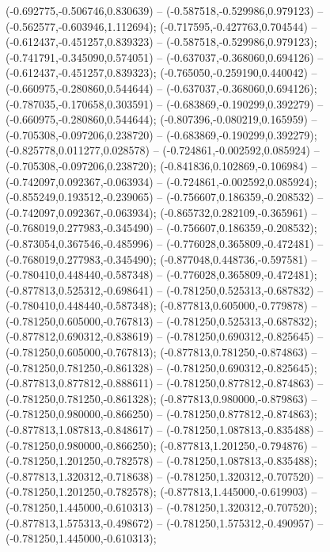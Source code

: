  (-0.692775,-0.506746,0.830639) -- (-0.587518,-0.529986,0.979123) -- (-0.562577,-0.603946,1.112694);
 (-0.717595,-0.427763,0.704544) -- (-0.612437,-0.451257,0.839323) -- (-0.587518,-0.529986,0.979123);
 (-0.741791,-0.345090,0.574051) -- (-0.637037,-0.368060,0.694126) -- (-0.612437,-0.451257,0.839323);
 (-0.765050,-0.259190,0.440042) -- (-0.660975,-0.280860,0.544644) -- (-0.637037,-0.368060,0.694126);
 (-0.787035,-0.170658,0.303591) -- (-0.683869,-0.190299,0.392279) -- (-0.660975,-0.280860,0.544644);
 (-0.807396,-0.080219,0.165959) -- (-0.705308,-0.097206,0.238720) -- (-0.683869,-0.190299,0.392279);
 (-0.825778,0.011277,0.028578) -- (-0.724861,-0.002592,0.085924) -- (-0.705308,-0.097206,0.238720);
 (-0.841836,0.102869,-0.106984) -- (-0.742097,0.092367,-0.063934) -- (-0.724861,-0.002592,0.085924);
 (-0.855249,0.193512,-0.239065) -- (-0.756607,0.186359,-0.208532) -- (-0.742097,0.092367,-0.063934);
 (-0.865732,0.282109,-0.365961) -- (-0.768019,0.277983,-0.345490) -- (-0.756607,0.186359,-0.208532);
 (-0.873054,0.367546,-0.485996) -- (-0.776028,0.365809,-0.472481) -- (-0.768019,0.277983,-0.345490);
 (-0.877048,0.448736,-0.597581) -- (-0.780410,0.448440,-0.587348) -- (-0.776028,0.365809,-0.472481);
 (-0.877813,0.525312,-0.698641) -- (-0.781250,0.525313,-0.687832) -- (-0.780410,0.448440,-0.587348);
 (-0.877813,0.605000,-0.779878) -- (-0.781250,0.605000,-0.767813) -- (-0.781250,0.525313,-0.687832);
 (-0.877812,0.690312,-0.838619) -- (-0.781250,0.690312,-0.825645) -- (-0.781250,0.605000,-0.767813);
 (-0.877813,0.781250,-0.874863) -- (-0.781250,0.781250,-0.861328) -- (-0.781250,0.690312,-0.825645);
 (-0.877813,0.877812,-0.888611) -- (-0.781250,0.877812,-0.874863) -- (-0.781250,0.781250,-0.861328);
 (-0.877813,0.980000,-0.879863) -- (-0.781250,0.980000,-0.866250) -- (-0.781250,0.877812,-0.874863);
 (-0.877813,1.087813,-0.848617) -- (-0.781250,1.087813,-0.835488) -- (-0.781250,0.980000,-0.866250);
 (-0.877813,1.201250,-0.794876) -- (-0.781250,1.201250,-0.782578) -- (-0.781250,1.087813,-0.835488);
 (-0.877813,1.320312,-0.718638) -- (-0.781250,1.320312,-0.707520) -- (-0.781250,1.201250,-0.782578);
 (-0.877813,1.445000,-0.619903) -- (-0.781250,1.445000,-0.610313) -- (-0.781250,1.320312,-0.707520);
 (-0.877813,1.575313,-0.498672) -- (-0.781250,1.575312,-0.490957) -- (-0.781250,1.445000,-0.610313);
